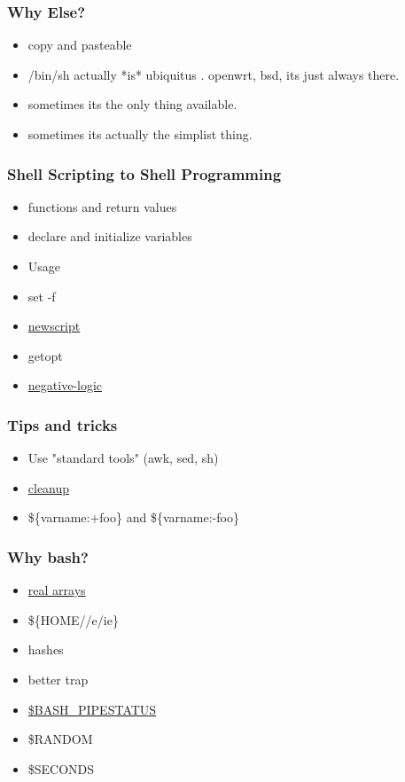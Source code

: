 \documentclass{beamer}
\begin{document}
\begin{frame}
   \frametitle{Why Else?}
   \begin{itemize}
      \item copy and pasteable
      \item /bin/sh actually *is* ubiquitus . openwrt, bsd, its just always there.
      \item sometimes its the only thing available.
      \item sometimes its actually the simplist thing.
   \end{itemize}
\end{frame}

\begin{frame}
   \frametitle{Shell Scripting to Shell Programming}
   \begin{itemize}
      \item functions and return values
      \item declare and initialize variables
      \item Usage
      \item set -f
      \item \href{https://github.com/smoser/talk-shell-script/blob/master/scripts/newscript}{newscript}
      \item getopt
      \item \href{https://github.com/smoser/talk-shell-script/blob/master/scripts/negative-logic}{negative-logic}
   \end{itemize}
\end{frame}

\begin{frame}
   \frametitle{Tips and tricks}
   \begin{itemize}
      \item Use "standard tools" (awk, sed, sh)
      \item \href{https://github.com/smoser/talk-shell-script/blob/master/scripts/cleanup}{cleanup}
      \item \$\{varname:+foo\} and \$\{varname:-foo\}
   \end{itemize}
\end{frame}

\begin{frame}
   \frametitle{Why bash?}
   \begin{itemize}
      \item \href{https://github.com/smoser/talk-shell-script/blob/master/scripts/arrays}{real arrays}
      \item \$\{HOME//e/ie\}
      \item hashes
      \item better trap
      \item \href{https://github.com/smoser/talk-shell-script/blob/master/scripts/}{\$BASH\_PIPESTATUS}
      \item \$RANDOM
      \item \$SECONDS
   \end{itemize}
\end{frame}
\end{document}
